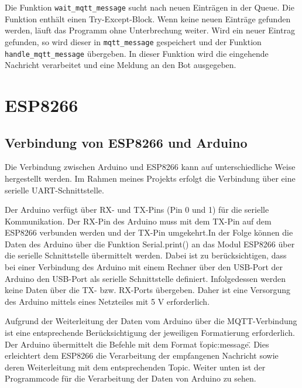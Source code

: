 \documentclass[12pt, letterpaper]{article}
\begin{document}
\par Die Funktion \texttt{wait\_mqtt\_message} sucht nach neuen Einträgen in der Queue. Die Funktion enthält einen Try-Except-Block. Wenn keine neuen Einträge gefunden werden, läuft das Programm ohne Unterbrechung weiter. Wird ein neuer Eintrag gefunden, so wird dieser in \texttt{mqtt\_message} gespeichert und der Funktion \texttt{handle\_mqtt\_message} übergeben. In dieser Funktion wird die eingehende Nachricht verarbeitet und eine Meldung an den Bot ausgegeben.
\section{ESP8266} \label{sec:esp}

\subsection[Arduino-ESP8266]{Verbindung von ESP8266 und Arduino}
\par Die Verbindung zwischen Arduino und ESP8266 kann auf unterschiedliche Weise hergestellt werden. Im Rahmen meines Projekts erfolgt die Verbindung über eine serielle UART-Schnittstelle.
\par Der Arduino verfügt über RX- und TX-Pins (Pin 0 und 1) für die serielle Kommunikation. Der RX-Pin des Arduino muss mit dem TX-Pin auf dem ESP8266 verbunden werden und der TX-Pin umgekehrt.In der Folge können die Daten des Arduino über die Funktion Serial.print() an das Modul ESP8266 über die serielle Schnittstelle übermittelt werden. Dabei ist zu berücksichtigen, dass bei einer Verbindung des Arduino mit einem Rechner über den USB-Port der Arduino den USB-Port als serielle Schnittstelle definiert. Infolgedessen werden keine Daten über die TX- bzw. RX-Ports übergeben. Daher ist eine Versorgung des Arduino mittels eines Netzteiles mit 5 V erforderlich.
\par Aufgrund der Weiterleitung der Daten vom Arduino über die MQTT-Verbindung ist eine entsprechende Berücksichtigung der jeweiligen Formatierung erforderlich. Der Arduino übermittelt die Befehle mit dem Format \"topic:message\". Dies erleichtert dem ESP8266 die Verarbeitung der empfangenen Nachricht sowie deren Weiterleitung mit dem entsprechenden Topic. Weiter unten ist der Programmcode für die Verarbeitung der Daten von Arduino zu sehen. 
\end{document}
